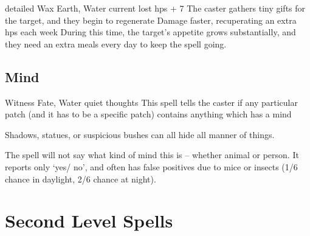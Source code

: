 \begin{multicols}{2}

  {detailed}%
  {Wax}%
  {Earth, Water}%
  {current lost \glspl{hp} + 7}%
  {The caster gathers tiny gifts for the target, and they begin to regenerate Damage faster, recuperating an extra  \glspl{hp} each week}%
  {During this time, the target's appetite grows substantially, and they need an extra  meals every day to keep the spell going.}

\subsection{Mind}


  {}%
  {Witness}%
  {Fate, Water}%
  {quiet thoughts}%
  {This spell tells the caster if any particular patch (and it has to be a specific patch) contains anything which has a mind}%
  {Shadows, statues, or suspicious bushes can all hide all manner of things.

    The spell will not say what kind of mind this is -- whether animal or person.
    It reports only `yes/ no', and often has false positives due to mice or insects (1/6 chance in daylight, 2/6 chance at night).}

\end{multicols}

\section{Second Level Spells}

